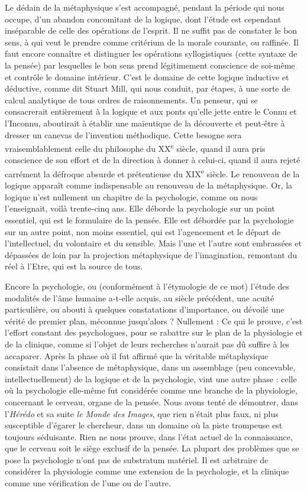 \documentclass[french,twoside]{book} %
\begin{document}
Le dédain de la métaphysique s’est accompagné, pendant la période qui nous occupe, d’un abandon concomitant de la logique, dont l’étude est cependant inséparable de celle des opérations de l’esprit. Il ne suffit pas de constater le bon sens, à qui veut le prendre comme critérium de la morale courante, ou raffinée. Il faut encore connaître et distinguer les opérations syllogistiques (cette syntaxe de la pensée) par lesquelles le bon sens prend légitimement conscience de soi-même et contrôle le domaine intérieur. C’est le domaine de cette logique inductive et déductive, comme dit Stuart Mill, qui nous conduit, par étapes, à une sorte de calcul analytique de tous ordres de raisonnements. Un penseur, qui se consacrerait entièrement à la logique et aux ponts qu’elle jette entre le Connu et l’Inconnu, aboutirait à établir une maïeutique de la découverte et peut-être à dresser un canevas de l’invention méthodique. Cette besogne sera vraisemblablement celle du philosophe du XX\textsuperscript{e} siècle, quand il aura pris conscience de son effort et de la direction à donner à celui-ci, quand il aura rejeté carrément la défroque absurde et prétentieuse du XIX\textsuperscript{e} siècle. Le renouveau de la logique apparaît comme indispensable au renouveau de la métaphysique. Or, la logique n’est nullement un chapitre de la psychologie, comme on nous l’enseignait, voilà trente-cinq ans. Elle déborde la psychologie sur un point essentiel, qui est le formulaire de la pensée. Elle est débordée par la psychologie sur un autre point, non moins essentiel, qui est l’agencement et le départ de l’intellectuel, du volontaire et du sensible. Mais l’une et l’autre sont embrassées et dépassées de loin par la projection métaphysique de l’imagination, remontant du réel à l’Etre, qui est la source de tous.\par
Encore la psychologie, ou (conformément à l’étymologie de ce mot) l’étude des modalités de l’âme humaine a-t-elle acquis, au siècle précédent, une acuité particulière, ou abouti à quelques constatations d’importance, ou dévoilé une vérité de premier plan, méconnue jusqu’alors ? Nullement : Ce qui le prouve, c’est l’effort constant des psychologues, pour se rabattre sur le plan de la physiologie et de la clinique, comme si l’objet de leurs recherches n’aurait pas dû suffire à les accaparer. Après la phase où il fut affirmé que la véritable métaphysique consistait dans l’absence de métaphysique, dans un assemblage (peu concevable, intellectuellement) de la logique et de la psychologie, vint une autre phase : celle où la psychologie elle-même fut considérée comme une branche de la physiologie, concernant le cerveau, organe de la pensée. Nous avons tenté de démontrer, dans l’{\itshape Hérédo} et sa suite {\itshape le Monde des Images}, que rien n’était plus faux, ni plus susceptible d’égarer le chercheur, dans un domaine où la piste trompeuse est toujours séduisante. Rien ne nous prouve, dans l’état actuel de la connaissance, que le cerveau soit le siège exclusif de la pensée. La plupart des problèmes que se pose la psychologie n’ont pas de substratum matériel. Il est arbitraire de considérer la physiologie comme une extension de la psychologie, et la clinique comme une vérification de l’une ou de l’autre.\par
\end{document}
